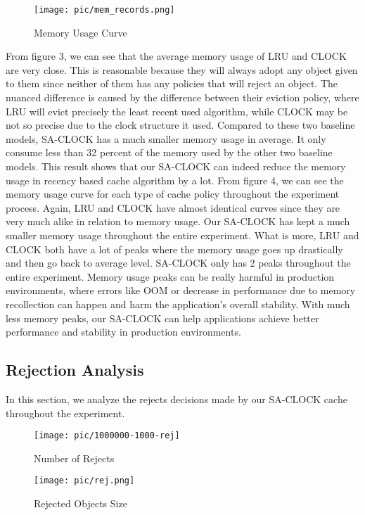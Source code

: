 \documentclass[conference]{IEEEtran}
\begin{document}
\begin{figure}[h]
\centerline{\texttt{[image: pic/mem\_records.png]}}
\caption{Memory Usage Curve}
\label{fig}
\end{figure}

From figure 3, we can see that the average memory usage of LRU and CLOCK are very close. This is reasonable because they will always adopt any object given to them since neither of them has any policies that will reject an object. The nuanced difference is caused by the difference between their eviction policy, where LRU will evict precisely the least recent used algorithm, while CLOCK may be not so precise due to the clock structure it used. Compared to these two baseline models, SA-CLOCK has a much smaller memory usage in average. It only consume less than 32 percent of the memory used by the other two baseline models. This result shows that our SA-CLOCK can indeed reduce the memory usage in recency based cache algorithm by a lot.  
From figure 4, we can see the memory usage curve for each type of cache policy throughout the experiment process. Again, LRU and CLOCK have almost identical curves since they are very much alike in relation to memory usage. Our SA-CLOCK has kept a much smaller memory usage throughout the entire experiment. What is more, LRU and CLOCK both have a lot of peaks where the memory usage goes up drastically and then go back to average level. SA-CLOCK only has 2 peaks throughout the entire experiment. Memory usage peaks can be really harmful in production environments, where errors like OOM or decrease in performance due to memory recollection can happen and harm the application's overall stability. With much less memory peaks, our SA-CLOCK can help applications achieve better performance and stability in production environments.


\subsection{Rejection Analysis}
In this section, we analyze the rejects decisions made by our SA-CLOCK cache throughout the experiment. 

\begin{figure}[h]
\centerline{\texttt{[image: pic/1000000-1000-rej]}}
\caption{Number of Rejects}
\label{fig}
\end{figure}


\begin{figure}[h]
\centerline{\texttt{[image: pic/rej.png]}}
\caption{Rejected Objects Size}
\label{fig}
\end{figure}
\end{document}
